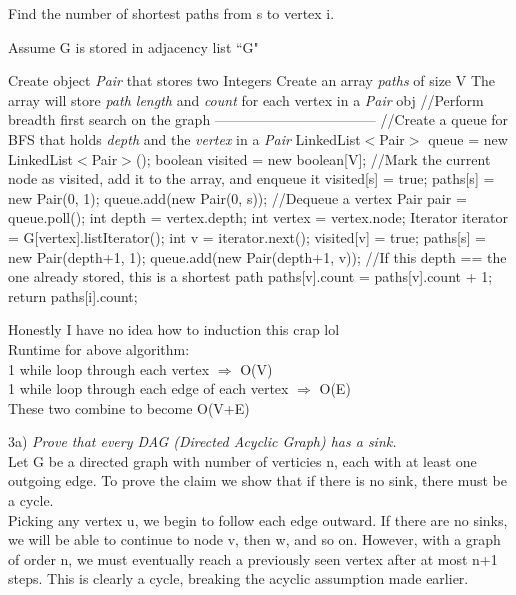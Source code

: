\documentclass[12pt]{article}
\begin{document}
\begin{algorithm}[H]
\caption{Find the number of shortest paths from s to vertex i.}
\begin{algorithmic}
\STATE Assume G is stored in adjacency list ``G"

\STATE 
\STATE Create object \textit{Pair} that stores two Integers
\STATE Create an array \textit{paths} of size V
\STATE The array will store \textit{path length} and \textit{count} for each vertex in a \textit{Pair} obj
\STATE
\STATE //Perform breadth first search on the graph -----------------------------------
\STATE
\STATE //Create a queue for BFS that holds \textit{depth} and the \textit{vertex} in a \textit{Pair}
\STATE LinkedList$<$Pair$>$ queue = new LinkedList$<$Pair$>$();
\STATE boolean visited = new boolean[V];
\STATE
\STATE //Mark the current node as visited, add it to the array, and enqueue it 
\STATE visited[s] = true; 
\STATE paths[s] = new Pair(0, 1);
\STATE queue.add(new Pair(0, s)); 
\STATE
{}
\STATE //Dequeue a vertex
\STATE Pair pair = queue.poll(); 
\STATE int depth = vertex.depth;
\STATE int vertex = vertex.node;
\STATE
\STATE Iterator iterator = G[vertex].listIterator();
\STATE int v = iterator.next(); 
\STATE
{}
\STATE visited[v] = true; 
\STATE paths[s] = new Pair(depth+1, 1);
\STATE queue.add(new Pair(depth+1, v));
\STATE
{}
\STATE //If this depth == the one already stored, this is a shortest path
\STATE paths[v].count = paths[v].count + 1;
\ENDIF
\ENDWHILE
\ENDWHILE
\STATE return paths[i].count;

\end{algorithmic}
\end{algorithm}
Honestly I have no idea how to induction this crap lol\\
\noindent Runtime for above algorithm: \\
1 while loop through each vertex $\Rightarrow$ O(V)\\
1 while loop through each edge of each vertex $\Rightarrow$ O(E)\\
These two combine to become O(V+E)



\pagebreak


\noindent 3a) \textit{Prove that every DAG (Directed Acyclic Graph) has a sink.}\\
Let G be a directed graph with number of verticies n, each with at least one outgoing edge. To prove the claim we show that if there is no sink, there must be a cycle. \\
Picking any vertex u, we begin to follow each edge outward. If there are no sinks, we will be able to continue to node v, then w, and so on. However, with a graph of order n, we must eventually reach a previously seen vertex after at most n+1 steps. This is clearly a cycle, breaking the acyclic assumption made earlier.\\
\end{document}
